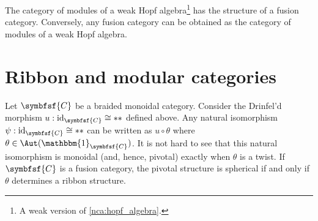     \begin{theorem}
        The category of modules of a weak Hopf algebra\footnote{A weak version of \cref{nca:hopf_algebra}.} has the structure of a fusion category. Conversely, any fusion category can be obtained as the category of modules of a weak Hopf algebra.
    \end{theorem}

\section{Ribbon and modular categories}


    \begin{property}
        Let $\symbfsf{C}$ be a braided monoidal category. Consider the Drinfel'd morphism $u:\mathrm{id}_{\symbfsf{C}}\cong\ast\ast$ defined above. Any natural isomorphism $\psi:\mathrm{id}_{\symbfsf{C}}\cong\ast\ast$ can be written as $u\circ\theta$ where $\theta\in\Aut(\mathbbm{1}_{\symbfsf{C}})$. It is not hard to see that this natural isomorphism is monoidal (and, hence, pivotal) exactly when $\theta$ is a twist. If $\symbfsf{C}$ is a fusion category, the pivotal structure is spherical if and only if $\theta$ determines a ribbon structure.
    \end{property}

